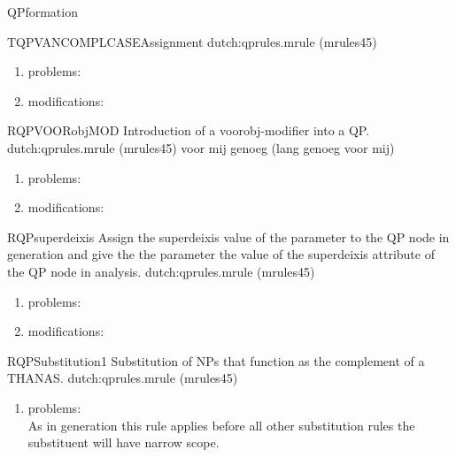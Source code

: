 \begin{mruleclass}{QPformation}
\begin{members}
\begin{member}
\end{member}
\begin{member}
 TQPVANCOMPLCASEAssignment
\file dutch:qprules.mrule (mrules45)
\semantics \nosemantics
\example
\remarks\mbox{}
\begin{enumerate}
\item problems:\\

\item modifications:\\

\end{enumerate}

\end{member}
\begin{member}
 RQPVOORobjMOD
 Introduction of a voorobj-modifier into a QP.
\file dutch:qprules.mrule (mrules45)
\semantics \nosemantics
\example voor mij genoeg (lang genoeg voor mij)
\remarks\mbox{}
\begin{enumerate}
\item problems:\\

\item modifications:\\

\end{enumerate}

\end{member}
\begin{member}
 RQPsuperdeixis
 Assign the superdeixis value of the parameter to the QP node 
in generation and give the the parameter the value of the superdeixis attribute 
of the QP node  in analysis.
\file dutch:qprules.mrule (mrules45)
\semantics \nosemantics
\example
\remarks\mbox{}
\begin{enumerate}
\item problems:\\

\item modifications:\\

\end{enumerate}

\end{member}
\begin{member}
 RQPSubstitution1
 Substitution of NPs that function as the complement of a THANAS.
\file dutch:qprules.mrule (mrules45)
\semantics \nosemantics
\example
\remarks\mbox{}
\begin{enumerate}
\item problems:\\ As in generation this rule applies before all other 
substitution rules the substituent will have narrow scope.


\end{enumerate}
\end{member}
\end{members}
\end{mruleclass}
